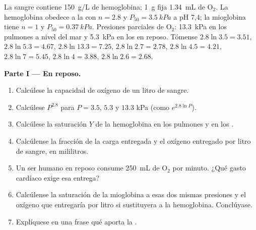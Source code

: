 \begin{problem}
\label{pb:b1:proteins:1}
La sangre contiene \qty{150}{g/L} de hemoglobina; \qty{1}{g} fija
\qty{1.34}{mL} de $\mathrm{O_2}$. La hemoglobina obedece a la  con $n = 2.8$ y $P_{50} = \qty{3.5}{kPa}$ a pH 7,4; la mioglobina tiene
$n = 1$ y $P_{50} = \qty{0.37}{kPa}$. Presiones parciales de
$\mathrm{O_2}$: \qty{13.3}{kPa} en los pulmones a nivel del mar y
\qty{5.3}{kPa} en los  en reposo. Tómense $2.8\ln 3.5 = 3.51$,
$2.8\ln 5.3 = 4.67$, $2.8\ln 13.3 = 7.25$, $2.8\ln 2.7 = 2.78$,
$2.8\ln 4.5 = 4.21$, $2.8\ln 7 = 5.45$, $2.8\ln 4 = 3.88$,
$2.8\ln 2.6 = 2.68$.

\medskip
\noindent\textbf{Parte I --- En reposo.}
\begin{enumerate}
  \item Calcúlese la capacidad de oxígeno de un litro de sangre.
  \item Calcúlese $P^{2.8}$ para $P = 3.5$, $5.3$ y $13.3$ kPa (como
        $e^{2.8\ln P}$).
  \item Calcúlese la saturación $Y$ de la hemoglobina en los pulmones y en
        los .
  \item Calcúlense la fracción de la carga entregada y el oxígeno entregado
        por litro de sangre, en mililitros.
  \item Un ser humano en reposo consume \qty{250}{mL} de $\mathrm{O_2}$ por
        minuto. ¿Qué gasto cardíaco exige esa entrega?
  \item Calcúlense la saturación de la mioglobina a esas dos mismas
        presiones y el oxígeno que entregaría por litro si sustituyera a la
        hemoglobina. Conclúyase.
  \item Explíquese en una frase qué aporta la .
\end{enumerate}


\end{problem}
